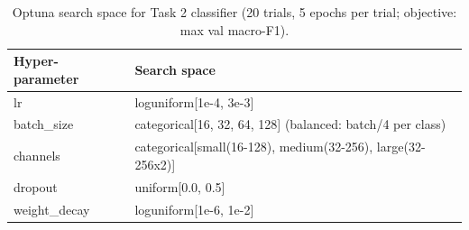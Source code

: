 \begin{table}[t]
\centering
\caption{Optuna search space for Task 2 classifier (20 trials, 5 epochs per trial; objective: max val macro-F1).}
\label{tab:space_task2_classifier}
\footnotesize
\begin{tabular}{lp{5.6cm}}
\toprule
Hyper-parameter & Search space \\
\midrule
lr & loguniform[1e-4, 3e-3] \\
batch\_size & categorical[16, 32, 64, 128] (balanced: batch/4 per class) \\
channels & categorical[small(16-128), medium(32-256), large(32-256x2)] \\
dropout & uniform[0.0, 0.5] \\
weight\_decay & loguniform[1e-6, 1e-2] \\
\bottomrule
\end{tabular}
\end{table}
